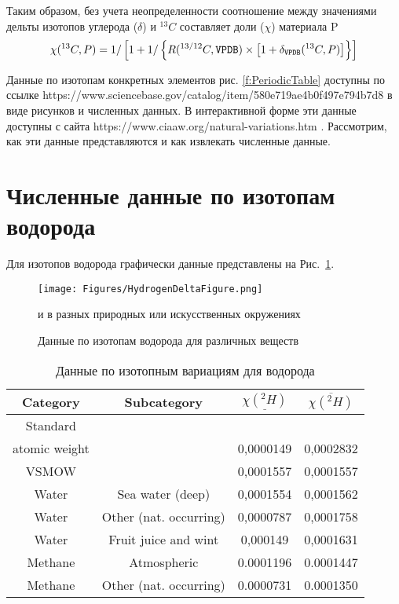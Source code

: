 \documentclass[a5paper,openany]{book}
\newcommand{\ov}{\overline}
\newcommand{\un}{\underline}
\begin{document}
Таким образом, без учета неопределенности соотношение между значениями дельты изотопов углерода ($\delta$) и $^{13}C$ составляет доли ($\chi$) материала P
\begin{equation} %
\chi(^{13}C, P) = 1/ \left[  1 + 1/ \left\lbrace  R (^{13/12}C, {\tt VPDB} ) \times \left[  1 + \delta_{\tt VPDB}(^{13}C, P) \right]  \right\rbrace \right]  
\end{equation}


Данные по изотопам конкретных элементов  рис. \ref{f:PeriodicTable}	доступны по ссылке https://www.sciencebase.gov/catalog/item/580e719ae4b0f497e794b7d8 \cite{IUPACTables} в виде рисунков и численных данных. В интерактивной форме эти данные доступны с сайта https://www.ciaaw.org/natural-variations.htm \cite{CIAAWnaturalVariation}. Рассмотрим, как эти данные представляются и как извлекать численные данные.



\section{Численные данные по изотопам водорода} \label{IsotopeDataH}
Для изотопов водорода графически данные представлены на Рис.~\ref{f:HydrogenDeltaFigure}.

\begin{figure}[ht] 
	\centering\small
	\unitlength=1mm
	\texttt{[image: Figures/HydrogenDeltaFigure.png]} 
	\caption{Данные по изотопам водорода для различных веществ} и в разных природных или искусственных  окружениях \cite{IUPACTables}
	\label{f:HydrogenDeltaFigure}
\end{figure}


\begin{table}[h]
	\centering
	{\footnotesize      
		\begin{tabular}{|c|c|c|c|}
			\hline
			Category &	Subcategory  & $\un{\chi(^2H)}$	&  $\ov{\chi(^2H)}$\\
			\hline
			Standard  & ~& ~ & ~   \\
			atomic weight & ~ &  0,0000149 & 0,0002832  \\
			\hline
			VSMOW & ~ &  0,0001557  & 0,0001557  \\
			\hline
			Water & Sea water (deep)&   0,0001554  & 0,0001562 \\
			Water  & Other (nat. occurring) &   0,0000787 & 0,0001758 \\
			Water  & Fruit juice and wint  &  0,000149 & 0,0001631 \\ 
			\hline
			Methane  & Atmospheric &  0.0001196 & 0.0001447 \\
			Methane  & Other (nat. occurring)  & 0.0000731 & 0.0001350 \\ 
			\hline
		\end{tabular}
	}
	\caption{Данные по изотопным вариациям для водорода}
	\label{t:IsotopeDataH}
\end{table}
\end{document}
